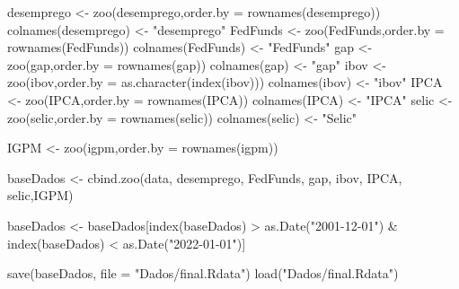\documentclass[
]{article}
\newenvironment{Shaded}{\begin{snugshade}}{\end{snugshade}}
\newcommand{\AttributeTok}[1]{\textcolor[rgb]{0.77,0.63,0.00}{#1}}
\newcommand{\FunctionTok}[1]{\textcolor[rgb]{0.00,0.00,0.00}{#1}}
\newcommand{\NormalTok}[1]{#1}
\newcommand{\OtherTok}[1]{\textcolor[rgb]{0.56,0.35,0.01}{#1}}
\newcommand{\SpecialCharTok}[1]{\textcolor[rgb]{0.00,0.00,0.00}{#1}}
\newcommand{\StringTok}[1]{\textcolor[rgb]{0.31,0.60,0.02}{#1}}
\begin{document}
\begin{Shaded}
\begin{Highlighting}[]
\NormalTok{desemprego }\OtherTok{\textless{}{-}} \FunctionTok{zoo}\NormalTok{(desemprego,}\AttributeTok{order.by =} \FunctionTok{rownames}\NormalTok{(desemprego))}
\FunctionTok{colnames}\NormalTok{(desemprego) }\OtherTok{\textless{}{-}} \StringTok{"desemprego"}
\NormalTok{FedFunds }\OtherTok{\textless{}{-}} \FunctionTok{zoo}\NormalTok{(FedFunds,}\AttributeTok{order.by =} \FunctionTok{rownames}\NormalTok{(FedFunds))}
\FunctionTok{colnames}\NormalTok{(FedFunds) }\OtherTok{\textless{}{-}} \StringTok{"FedFunds"}
\NormalTok{gap }\OtherTok{\textless{}{-}} \FunctionTok{zoo}\NormalTok{(gap,}\AttributeTok{order.by =} \FunctionTok{rownames}\NormalTok{(gap))}
\FunctionTok{colnames}\NormalTok{(gap) }\OtherTok{\textless{}{-}} \StringTok{"gap"}
\NormalTok{ibov }\OtherTok{\textless{}{-}} \FunctionTok{zoo}\NormalTok{(ibov,}\AttributeTok{order.by =} \FunctionTok{as.character}\NormalTok{(}\FunctionTok{index}\NormalTok{(ibov)))}
\FunctionTok{colnames}\NormalTok{(ibov) }\OtherTok{\textless{}{-}} \StringTok{"ibov"}
\NormalTok{IPCA }\OtherTok{\textless{}{-}} \FunctionTok{zoo}\NormalTok{(IPCA,}\AttributeTok{order.by =} \FunctionTok{rownames}\NormalTok{(IPCA))}
\FunctionTok{colnames}\NormalTok{(IPCA) }\OtherTok{\textless{}{-}} \StringTok{"IPCA"}
\NormalTok{selic }\OtherTok{\textless{}{-}} \FunctionTok{zoo}\NormalTok{(selic,}\AttributeTok{order.by =} \FunctionTok{rownames}\NormalTok{(selic))}
\FunctionTok{colnames}\NormalTok{(selic) }\OtherTok{\textless{}{-}} \StringTok{"Selic"}

\NormalTok{IGPM }\OtherTok{\textless{}{-}} \FunctionTok{zoo}\NormalTok{(igpm,}\AttributeTok{order.by =} \FunctionTok{rownames}\NormalTok{(igpm))}

\NormalTok{baseDados }\OtherTok{\textless{}{-}} \FunctionTok{cbind.zoo}\NormalTok{(data, desemprego, FedFunds, gap, ibov, IPCA, selic,IGPM)}


\NormalTok{baseDados }\OtherTok{\textless{}{-}}\NormalTok{ baseDados[}\FunctionTok{index}\NormalTok{(baseDados) }\SpecialCharTok{\textgreater{}} \FunctionTok{as.Date}\NormalTok{(}\StringTok{"2001{-}12{-}01"}\NormalTok{) }\SpecialCharTok{\&} \FunctionTok{index}\NormalTok{(baseDados) }\SpecialCharTok{\textless{}} \FunctionTok{as.Date}\NormalTok{(}\StringTok{"2022{-}01{-}01"}\NormalTok{)]}


\FunctionTok{save}\NormalTok{(baseDados, }\AttributeTok{file =} \StringTok{"Dados/final.Rdata"}\NormalTok{)}
\FunctionTok{load}\NormalTok{(}\StringTok{"Dados/final.Rdata"}\NormalTok{)}
\end{Highlighting}
\end{Shaded}
\end{document}

